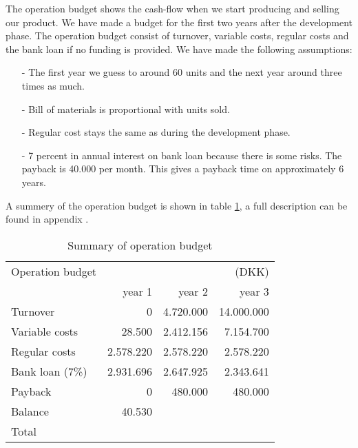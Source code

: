 The operation budget shows the cash-flow when we start producing and selling our product. We have made a budget for the first two years after the development phase. The operation budget consist of turnover, variable costs, regular costs and the bank loan if no funding is provided. We have made the following assumptions:
\begin{itemize}
\item[-] The first year we guess to around 60 units and the next year around three times as much.
\item[-] Bill of materials is proportional with units sold.
\item[-] Regular cost stays the same as during the development phase.
\item[-] 7 percent in annual interest on bank loan because there is some risks. The payback is 40.000 per month. This gives a payback time on approximately 6 years.
\end{itemize}
A summery of the operation budget is shown in table \ref{opebud}, a full description can be found in appendix .
\begin{table}[h!]
\label{opebud}
\centering
\begin{tabular}{l r r r}
Operation budget      &           &           & (DKK)      \\
                      & year 1    & year 2    & year 3     \\
\hline                
Turnover              &         0 & 4.720.000 & 14.000.000 \\
Variable costs        &    28.500 & 2.412.156 &  7.154.700 \\
Regular costs         & 2.578.220 & 2.578.220 &  2.578.220 \\
Bank loan (7\%)       & 2.931.696 & 2.647.925 &  2.343.641 \\
Payback               &         0 &   480.000 &    480.000 \\
Balance               &    40.530 &           &            \\  
\hline                                                      
Total                 &           &           &            \\
\end{tabular}
\caption{Summary of operation budget}
\end{table}

